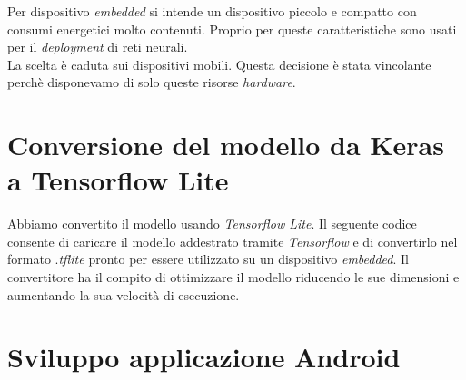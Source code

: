 Per dispositivo \textit{embedded} si intende un dispositivo piccolo e compatto con consumi energetici molto contenuti. Proprio per queste caratteristiche sono usati per il \textit{deployment} di reti neurali.\\
La scelta è caduta sui dispositivi mobili. Questa decisione è stata vincolante perchè disponevamo di solo queste risorse \textit{hardware}.

\section{Conversione del modello da Keras a Tensorflow Lite}
Abbiamo convertito il modello usando \textit{Tensorflow Lite}. Il seguente codice consente di caricare il modello addestrato tramite \textit{Tensorflow} e di convertirlo nel formato .\textit{tflite} pronto per essere utilizzato su un dispositivo \textit{embedded}.
\vspace*{2ex}
\noindent Il convertitore ha il compito di ottimizzare il modello riducendo le sue dimensioni e aumentando la sua velocità di esecuzione.
\section{Sviluppo applicazione Android}
